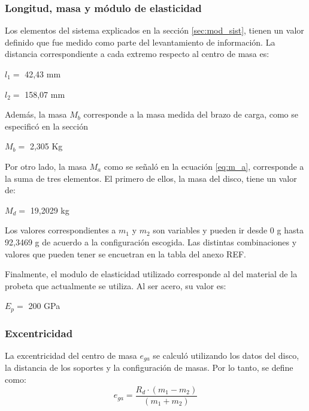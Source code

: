 \subsubsection{Longitud, masa y módulo de elasticidad}
Los elementos del sistema explicados en la sección \ref{sec:mod_sist}, tienen un valor definido que fue medido como parte del levantamiento de información. La distancia correspondiente a cada extremo respecto al centro de masa es:
\begin{itemize*}
	\item $l_1=$ 42,43 mm
	\item $l_2=$ 158,07 mm
\end{itemize*}
Además, la masa $M_b$ corresponde a la masa medida del brazo de carga, como se especificó en la sección
\begin{itemize*}
	\item $M_b=$ 2,305 Kg
\end{itemize*}
Por otro lado, la masa $M_a$ como se señaló en la ecuación \ref{eq:m_a}, corresponde a la suma de tres elementos. El primero de ellos, la masa del disco, tiene un valor de:
\begin{itemize*}
	\item $M_d=$ 19,2029 kg
\end{itemize*}
Los valores correspondientes a $m_1$ y $m_2$ son variables y pueden ir desde 0 g hasta 92,3469 g de acuerdo a la configuración escogida. Las distintas combinaciones y valores que pueden tener se encuetran en la tabla del anexo REF.

Finalmente, el modulo de elasticidad utilizado corresponde al del material de la probeta que actualmente se utiliza. Al ser acero, su valor es:
\begin{itemize*}
	\item $E_p=$ 200 GPa
\end{itemize*}
\subsubsection{Excentricidad}
La excentricidad del centro de masa $e_{ga}$ se calculó utilizando los datos del disco, la distancia de los soportes y la configuración de masas. Por lo tanto, se define como:
\begin{equation}
	e_{ga} = \frac{R_d\cdot (m_1 - m_2)}{(m_1 + m_2)}
\end{equation}
